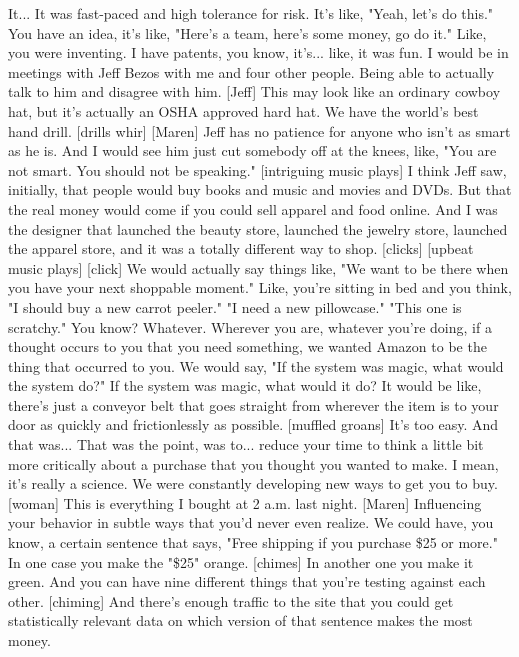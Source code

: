 \documentclass[a4paper]{article}
\begin{document}
	It... It was fast-paced and high tolerance for risk.
	It's like, "Yeah, let's do this."
	You have an idea, it's like, "Here's a team, here's some money, go do it."
	Like, you were inventing. I have patents, you know, it's... like, it was fun.
	I would be in meetings with Jeff Bezos with me and four other people.
	Being able to actually talk to him and disagree with him.
	[Jeff] This may look like an ordinary cowboy hat,
	but it's actually an OSHA approved hard hat.
	We have the world's best hand drill.
	[drills whir]
	[Maren] Jeff has no patience for anyone who isn't as smart as he is.
	And I would see him just cut somebody off at the knees, like,
	"You are not smart. You should not be speaking."
	[intriguing music plays]
	I think Jeff saw, initially, that people would buy books and music
	and movies and DVDs.
	But that the real money would come if you could sell apparel
	and food online.
	And I was the designer that launched the beauty store,
	launched the jewelry store, launched the apparel store,
	and it was a totally different way to shop.
	[clicks]
	[upbeat music plays]
	[click]
	We would actually say things like, "We want to be there when
	you have your next shoppable moment."
	Like, you're sitting in bed and you think, "I should buy a new carrot peeler."
	"I need a new pillowcase."
	"This one is scratchy." You know? Whatever.
	Wherever you are, whatever you're doing,
	if a thought occurs to you that you need something,
	we wanted Amazon to be the thing that occurred to you.
	We would say, "If the system was magic, what would the system do?"
	If the system was magic, what would it do?
	It would be like,
	there's just a conveyor belt that goes straight from wherever the item is
	to your door as quickly and frictionlessly as possible.
	[muffled groans]
	It's too easy. And that was... That was the point,
	was to...
	reduce your time to think a little bit more critically about
	a purchase that you thought you wanted to make.
	I mean, it's really a science.
	We were constantly developing new ways to get you to buy.
	[woman] This is everything I bought at 2 a.m. last night.
	[Maren] Influencing your behavior in subtle ways that you'd never even realize.
	We could have, you know, a certain sentence that says,
	"Free shipping if you purchase \$25 or more."
	In one case you make the "\$25" orange.
	[chimes]
	In another one you make it green.
	And you can have nine different things that you're testing against each other.
	[chiming]
	And there's enough traffic to the site
	that you could get statistically relevant data
	on which version of that sentence
	makes the most money.
\end{document}
